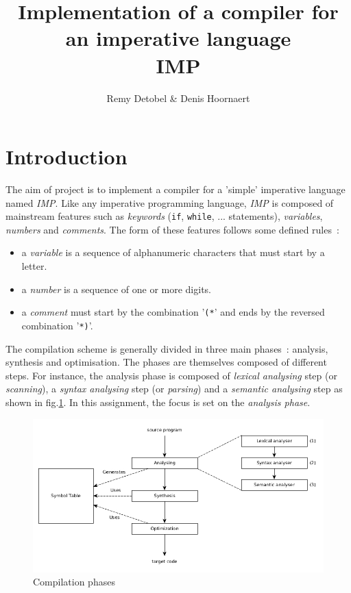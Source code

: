 \documentclass[a4paper,11pt]{article}
\title{Implementation of a compiler for an imperative language\\IMP}
\author{Remy Detobel \& Denis Hoornaert}
\begin{document}
\maketitle
\tableofcontents

\section{Introduction}

  The aim of project is to implement a compiler for a 'simple' imperative language named \textit{IMP}. Like any imperative programming language, \textit{IMP} is composed of mainstream features such as \textit{keywords} (\verb|if|, \verb|while|, ... statements), \textit{variables}, \textit{numbers} and \textit{comments}.
  The form of these features follows some defined rules~:
  \begin{itemize}
    \item a \textit{variable} is a sequence of alphanumeric characters that must start by a letter.
    \item a \textit{number} is a sequence of one or more digits.
    \item a \textit{comment} must start by the combination '\verb|(*|' and ends by the reversed combination '\verb|*)|'. 
  \end{itemize}
  The compilation scheme is generally divided in three main phases~: analysis, synthesis and optimisation. The phases are themselves composed of different steps. For instance, the analysis phase is composed of \textit{lexical analysing} step (or \textit{scanning}), a \textit{syntax analysing} step (or \textit{parsing}) and a \textit{semantic analysing} step as shown in fig.\ref{compilation_phases}. In this assignment, the focus is set on the \textit{analysis phase}.
  \begin{figure}[h]
    \includegraphics[scale=0.45]{./img/phase_of_compiler.jpg}
    \centering
    \caption{Compilation phases}
    \label{compilation_phases}
  \end{figure}
  
\end{document}
